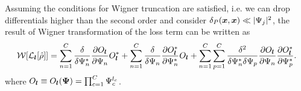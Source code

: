 \begin{theorem}
Assuming the conditions for Wigner truncation are satisfied,
i.e. we can drop differentials higher than the second order and consider $\delta_P(\boldsymbol{x}, \boldsymbol{x}) \ll | \Psi_j |^2$,
the result of Wigner transformation of the loss term can be written as
\begin{equation*}
\begin{split}
	\mathcal{W}[\mathcal{L}_{\boldsymbol{l}}[\hat{\rho}]]
	= \sum_{n=1}^C
			\frac{\delta}{\delta \Psi_n^*} \frac{\partial O_{\boldsymbol{l}}}{\partial \Psi_n} O_{\boldsymbol{l}}^*
	+ \sum_{n=1}^C
		\frac{\delta}{\delta \Psi_n} \frac{\partial O_{\boldsymbol{l}}^*}{\partial \Psi_n^*} O_{\boldsymbol{l}}
	+ \sum_{n=1}^C \sum_{p=1}^C
		\frac{\delta^2}{\delta \Psi_n^* \delta \Psi_p}
		\frac{\partial O_{\boldsymbol{l}}}{\partial \Psi_n}
		\frac{\partial O_{\boldsymbol{l}}^*}{\partial \Psi_p^*}.
\end{split}
\end{equation*}
where $O_{\boldsymbol{l}} \equiv O_{\boldsymbol{l}}(\boldsymbol{\Psi}) = \prod_{c=1}^C \Psi_c^{l_c}$.
\end{theorem}
